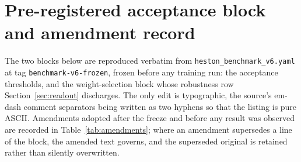 \documentclass{article}
\begin{document}
\appendix
\section{Pre-registered acceptance block and amendment record}
\label{app:thresholds}
The two blocks below are reproduced verbatim from
\texttt{heston\_benchmark\_v6.yaml} at tag \texttt{benchmark-v6-frozen}, frozen
before any training run: the acceptance thresholds, and the weight-selection block
whose robustness row Section~\ref{sec:readout} discharges. The only edit is
typographic, the source's em-dash comment separators being written as two hyphens
so that the listing is pure ASCII. Amendments adopted after the freeze and before any result
was observed are recorded in Table~\ref{tab:amendments}; where an amendment
supersedes a line of the block, the amended text governs, and the superseded
original is retained rather than silently overwritten.
\end{document}
